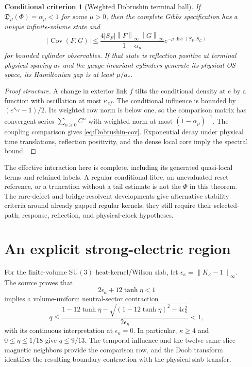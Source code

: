 \documentclass[11pt,oneside,openany]{book}
\newtheorem{criterion}[criterion]{Conditional criterion}
\theoremstyle{definition}
\theoremstyle{remark}
\newcommand{\Cov}{\operatorname{Cov}}
\newcommand{\dist}{\operatorname{dist}}
\newcommand{\SU}{\mathrm{SU}}
\newcommand{\norm}[1]{\left\lVert#1\right\rVert}
\newcommand{\src}[2]{\cite[#2]{#1}}
\begin{document}
\begin{criterion}[Weighted Dobrushin terminal ball]\label{thm:Dobrushin}
If $\mathfrak D_\mu(\Phi)=\alpha_\mu<1$ for some $\mu>0$, then the complete Gibbs specification has a unique infinite-volume state and
\begin{equation}\label{eq:Dobrushin-cov}
|\Cov(F,G)|\le
\frac{4|S_F|\norm F_\infty\norm G_\infty}{1-\alpha_\mu}
 e^{-\mu\dist(S_F,S_G)}
\end{equation}
for bounded cylinder observables. If that state is reflection positive at terminal physical spacing $a_*$ and the gauge-invariant cylinders generate its physical OS space, its Hamiltonian gap is at least $\mu/a_*$.
\end{criterion}
\begin{proof}[Proof structure]
A change in exterior link $f$ tilts the conditional density at $e$ by a function with oscillation at most $\kappa_{ef}$. The conditional influence is bounded by $(e^{\kappa_{ef}}-1)/2$. Its weighted row norm is below one, so the comparison matrix has convergent series $\sum_{n\ge0}C^n$ with weighted norm at most $(1-\alpha_\mu)^{-1}$. The coupling comparison gives \cref{eq:Dobrushin-cov}. Exponential decay under physical time translations, reflection positivity, and the dense local core imply the spectral bound. \src{F7}{V82--V83}
\end{proof}

The effective interaction here is complete, including its generated quasi-local terms and retained labels. A regular conditional fibre, an unevaluated reset reference, or a truncation without a tail estimate is not the $\Phi$ in this theorem. The rare-defect and bridge-resolvent developments give alternative stability criteria around already gapped regular kernels; they still require their selected-path, response, reflection, and physical-clock hypotheses. \src{F7}{V84--V91}

\section{An explicit strong-electric region}
For the finite-volume $\SU(3)$ heat-kernel/Wilson slab, let $\epsilon_\kappa=\norm{K_\kappa-1}_\infty$. The source proves that
\[
2\epsilon_\kappa+12\tanh\eta<1
\]
implies a volume-uniform neutral-sector contraction
\begin{equation}\label{eq:strong-electric}
q\le\frac{1-12\tanh\eta-
\sqrt{(1-12\tanh\eta)^2-4\epsilon_\kappa^2}}
{2\epsilon_\kappa}<1,
\end{equation}
with its continuous interpretation at $\epsilon_\kappa=0$. In particular, $\kappa\ge4$ and $0\le\eta\le1/18$ give $q\le9/13$. The temporal influence and the twelve same-slice magnetic neighbors provide the comparison row, and the Doob transform identifies the resulting boundary contraction with the physical slab transfer. \cite{GT}
\end{document}
